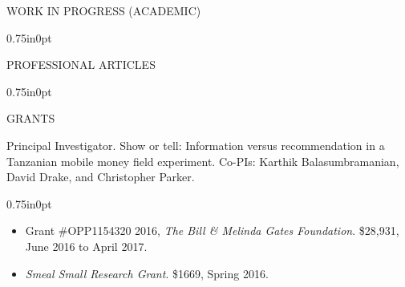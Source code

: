 \documentclass[letterpaper,11pt,oneside]{article}
\newcommand\myIndent{0.75in}
\newcommand\myParSkip{3pt}
\newcommand\myHangIndent{1in}
\newcommand\myNegSpaceCorrectBib{-4.25em}
\newcommand\mySpaceBeforeSectionAfterBib{0em}
\newcommand{\NiceIndent}{ \parindent=\myIndent \hangindent=\myHangIndent }
\newenvironment{miniListBullet}
    {
        \begin{adjustwidth}{\myIndent}{0pt}
        \setlength{\parskip}{0pt}%
        \renewcommand\labelitemi{{\boldmath$\cdot$}}
        \begin{itemize}
        \setlength\itemsep{0em}
    }
    {
        \end{itemize}
        \setlength{\parskip}{\myParSkip}%
        \end{adjustwidth}
    }
\begin{document}
\vspace{\mySpaceBeforeSectionAfterBib}
\noindent WORK IN PROGRESS (ACADEMIC)
\vspace{\myNegSpaceCorrectBib}
\begin{bibunit}
    \begin{adjustwidth}{\myIndent}{0pt}
        
        
        \nocite{sun_dual_2018}
        \nocite{acimovic_heterolead_2018}
        \nocite{balasubramanian_pool_2018}
        \nocite{acimovic_humanitarian_supply_2019}
        \nocite{acimovic_nutriset_2018}
        
        \putbib
    \end{adjustwidth}
\end{bibunit}

\vspace{\mySpaceBeforeSectionAfterBib}
\noindent PROFESSIONAL ARTICLES
\vspace{\myNegSpaceCorrectBib}
\begin{bibunit}
    \begin{adjustwidth}{\myIndent}{0pt}
        
        
        \nocite{acimovic_agility_2017}

        
        \putbib
    \end{adjustwidth}
\end{bibunit}

\vspace{\mySpaceBeforeSectionAfterBib}





\noindent GRANTS

\NiceIndent Principal Investigator.  Show or tell: Information versus recommendation in a Tanzanian mobile money field experiment.   Co-PIs: Karthik Balasumbramanian, David Drake, and Christopher Parker.
\begin{miniListBullet}
    \item Grant \#OPP1154320 2016,  \textit{The Bill \& Melinda Gates Foundation}.  \$28,931, June 2016 to April 2017.
    \item \textit{Smeal Small Research Grant}.  \$1669, Spring 2016.
\end{miniListBullet}
\end{document}
